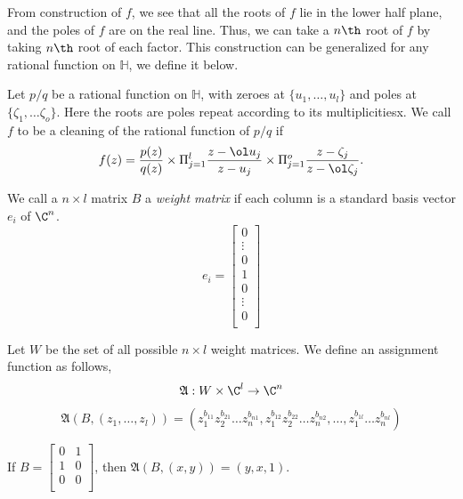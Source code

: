 \noindent From construction of $f$, we see that all the roots of $f$ lie in the lower half plane, and the poles of $f$ are on the real line. Thus, we can take a $n\th$ root of $f$ by taking $n\th$ root of each factor. This construction can be generalized for any rational function on $\mathbb H$, we define it below.
%

\begin{defn}
    Let $p/q$ be a rational function  on $\mathbb H$,  with zeroes at $\{u_1,\dots, u_l\}$ and poles at $\{\zeta_1,\dots \zeta_o\}$. Here the roots are poles repeat according to its multiplicitiesx. We call $f$ to be a cleaning of the rational function of $p/q$ if $$ f(z) = \frac{p(z)}{q(z)} \times \Pi_{j=1}^l \frac{z-\ol u_j}{z-u_j} \times \Pi_{j=1}^o \frac{z- \zeta_j}{z-\ol \zeta_j}. $$
\end{defn}



\begin{defn}\label{defn:weightmatrix}
    We call a $n \times l $ matrix $B$ a \textit{weight matrix} if each column is a standard basis vector $e_i$ of $\C^n$.  $$e_i = \begin{bmatrix}
0 \\
\vdots \\ 
0 \\
1  \\
0  \\
\vdots \\
0\\ 
\end{bmatrix}$$

\end{defn}

\begin{defn}
    Let  $W$ be the set of all possible $n \times l$ weight matrices. We define an assignment function as follows,
    $$\mathfrak{A} : W \times \C^l \to \C^n$$
    $$\mathfrak{A}(B,(z_1,\dots,z_l)) = ( z_1^{b_{11}} z_2^{b_{21}}\dots z_n^{b_{n1}},   z_1^{b_{12}}z_2^{b_{22}}\dots z_n^{b_{n2}},\dots,  z_1^{b_{1l}}\dots z_n^{b_{nl}} ) $$
\end{defn}

\begin{example}
    If $B =  \begin{bmatrix}
0 & 1 \\
1  & 0 \\
0   & 0\\
\end{bmatrix}$, then $\mathfrak{A}(B,(x,y)) = (y,x,1) .$
\end{example}

